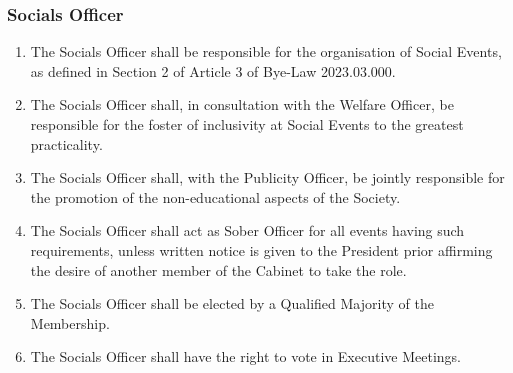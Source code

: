 \documentclass{scrartcl}
\begin{document}
            \subsubsection{Socials Officer}
                \label{executive--positions--socials-officer}
                \begin{enumerate}
                    \item The Socials Officer shall be responsible for the organisation of Social Events, as defined in Section 2 of Article 3 of Bye-Law 2023.03.000.
                    \item The Socials Officer shall, in consultation with the Welfare Officer, be responsible for the foster of inclusivity at Social Events to the greatest practicality.
                    \item The Socials Officer shall, with the Publicity Officer, be jointly responsible for the promotion of the non-educational aspects of the Society.
                    \item The Socials Officer shall act as Sober Officer for all events having such requirements, unless written notice is given to the President prior affirming the desire of another member of the Cabinet to take the role.
                    \item The Socials Officer shall be elected by a Qualified Majority of the Membership.
                    \item The Socials Officer shall have the right to vote in Executive Meetings.
                \end{enumerate}
\end{document}
